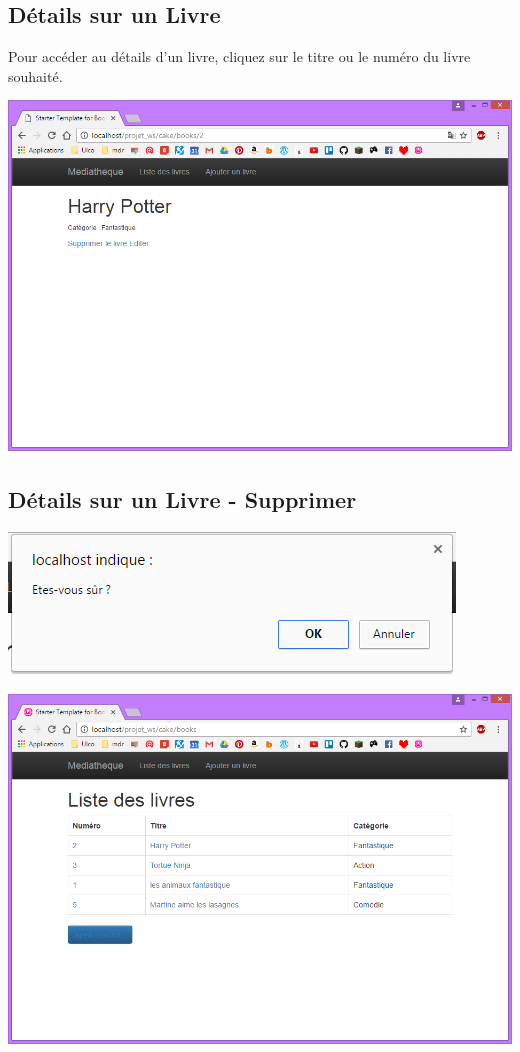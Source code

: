 \documentclass{report}
\begin{document}
			\subsection{D\'{e}tails sur un Livre}
			Pour acc\'{e}der au d\'{e}tails d'un livre, cliquez sur le titre ou le num\'{e}ro du livre souhait\'{e}.
			\begin{center}
				\includegraphics[scale=0.5]{img/manuel/DetailLivre.png}  
			\end{center}
			
			\subsection{D\'{e}tails sur un Livre - Supprimer}
			\begin{center}
				\includegraphics[scale=0.5]{img/manuel/DetailLivre_Supprimer.png}  
			\end{center}
			
			\begin{center}
				\includegraphics[scale=0.5]{img/manuel/DetailLivre_Supprimer_success.png}  
			\end{center}
			
\end{document}
